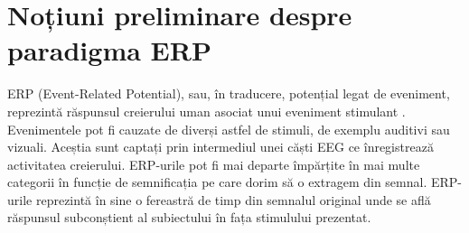 \section{Noțiuni preliminare despre paradigma ERP}

ERP (Event-Related Potential), sau, în traducere, potențial legat de eveniment, reprezintă răspunsul creierului uman asociat unui eveniment stimulant \cite{erp_introduction}. Evenimentele pot fi cauzate de diverși astfel de stimuli, de exemplu auditivi sau vizuali. Aceștia sunt captați prin intermediul unei căști EEG ce înregistrează activitatea creierului. ERP-urile pot fi mai departe împărțite în mai multe categorii în funcție de semnificația pe care dorim să o extragem din semnal. ERP-urile reprezintă în sine o fereastră de timp din semnalul original unde se află răspunsul subconștient al subiectului în fața stimulului prezentat.
